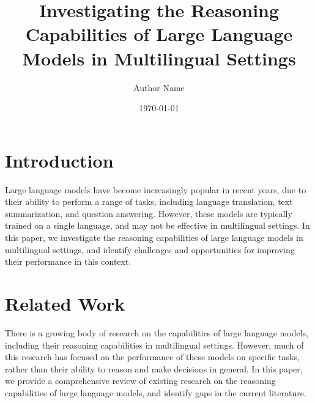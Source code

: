 \documentclass{article}
\begin{document}
\title{Investigating the Reasoning Capabilities of Large Language Models in Multilingual Settings}

\author{Author Name}

\date{\today}

\maketitle


\section{Introduction}

Large language models have become increasingly popular in recent years, due to their ability to perform a range of tasks, including language translation, text summarization, and question answering. However, these models are typically trained on a single language, and may not be effective in multilingual settings. In this paper, we investigate the reasoning capabilities of large language models in multilingual settings, and identify challenges and opportunities for improving their performance in this context.

\section{Related Work}

There is a growing body of research on the capabilities of large language models, including their reasoning capabilities in multilingual settings. However, much of this research has focused on the performance of these models on specific tasks, rather than their ability to reason and make decisions in general. In this paper, we provide a comprehensive review of existing research on the reasoning capabilities of large language models, and identify gaps in the current literature.
\end{document}
